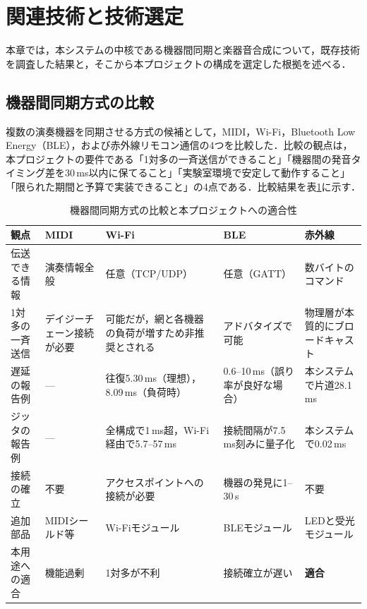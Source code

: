 \documentclass[uplatex,dvipdfmx]{jlreq}
\begin{document}
\section{関連技術と技術選定}
\label{sec:relwork}

本章では，本システムの中核である機器間同期と楽器音合成について，既存技術を調査した結果と，そこから本プロジェクトの構成を選定した根拠を述べる．

\subsection{機器間同期方式の比較}
\label{sec:sync-compare}

複数の演奏機器を同期させる方式の候補として，MIDI，Wi-Fi，Bluetooth Low Energy（BLE），および赤外線リモコン通信の4つを比較した．比較の観点は，本プロジェクトの要件である「1対多の一斉送信ができること」「機器間の発音タイミング差を30\,ms以内に保てること」「実験室環境で安定して動作すること」「限られた期間と予算で実装できること」の4点である．比較結果を表\ref{tab:sync-compare}に示す．

\begin{table}[tb]
\caption{機器間同期方式の比較と本プロジェクトへの適合性}
\label{tab:sync-compare}
\begin{center}
\footnotesize
\begin{tabular}{lp{6em}p{7.5em}p{7.5em}p{6.5em}}
\hline
観点 & MIDI\cite{midi} & Wi-Fi & BLE & 赤外線\cite{necfmt,sircfmt} \\
\hline
伝送できる情報 & 演奏情報全般 & 任意（TCP/UDP） & 任意（GATT） & 数バイトのコマンド \\
1対多の一斉送信 & デイジーチェーン接続が必要 & 可能だが，網と各機器の負荷が増すため非推奨とされる\cite{mitchell2014} & アドバタイズで可能 & 物理層が本質的にブロードキャスト\cite{rubenstein2012} \\
遅延の報告例 & --- & 往復5.30\,ms（理想），8.09\,ms（負荷時）\cite{mitchell2014} & 0.6--10\,ms（誤り率が良好な場合）\cite{tosi2017} & 本システムで片道28.1\,ms \\
ジッタの報告例 & --- & 全構成で1\,ms超，Wi-Fi経由で5.7--57\,ms\cite{mcpherson2016} & 接続間隔が7.5\,ms刻みに量子化\cite{gomez2012} & 本システムで0.02\,ms \\
接続の確立 & 不要 & アクセスポイントへの接続が必要 & 機器の発見に1--30\,s\cite{tosi2017} & 不要 \\
追加部品 & MIDIシールド等 & Wi-Fiモジュール & BLEモジュール & LEDと受光モジュール \\
本用途への適合 & 機能過剰 & 1対多が不利 & 接続確立が遅い & \textbf{適合} \\
\hline
\end{tabular}
\end{center}
\end{table}
\end{document}
